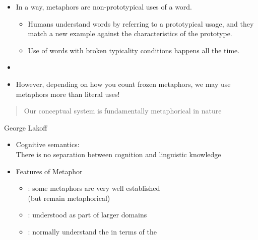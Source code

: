 \documentclass[a4paper,landscape,headrule,footrule,xetex]{foils}
\begin{document}
\begin{itemize}
\item In a way, metaphors are non-prototypical uses of a word.
\begin{itemize}
\item Humans understand words by referring to a prototypical usage,
and they match a new example against the characteristics of the
prototype.
\item  Use of words with broken typicality conditions happens all the
time.
\end{itemize}
\item
  \begin{exe}
    \ex {}
    \ex {}
    \ex {}
    \ex {}
    \ex {}
    \ex {}
  \end{exe}
\item However, depending on how you count frozen metaphors, 
we may use metaphors more than literal uses!
\end{itemize}


\begin{quote}
  \Large Our conceptual system is fundamentally
metaphorical in nature
\end{quote}
\begin{flushright}
  George Lakoff
\end{flushright}

\begin{itemize}
\item Cognitive semantics:
\\ There is no separation between cognition and
linguistic knowledge
\item Features of Metaphor
\begin{itemize}
\item {}: some metaphors are very well established 
\\ (but remain metaphorical)
\item {}: understood as part of larger domains
\item {}: normally understand the  
  in terms of the 
\end{itemize}

\end{itemize}
\end{document}
